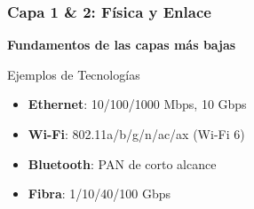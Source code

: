 \documentclass[aspectratio=169]{beamer}
\begin{document}
      \begin{frame}
        \frametitle{Capa 1 \& 2: Física y Enlace}
        
        \begin{center}
        \Large \textbf{Fundamentos de las capas más bajas}
        \end{center}
        
        
        \begin{block}{Ejemplos de Tecnologías}
        \begin{itemize}
        \item \textbf{Ethernet}: 10/100/1000 Mbps, 10 Gbps
        \item \textbf{Wi-Fi}: 802.11a/b/g/n/ac/ax (Wi-Fi 6)
        \item \textbf{Bluetooth}: PAN de corto alcance
        \item \textbf{Fibra}: 1/10/40/100 Gbps
        \end{itemize}
        \end{block}
        \end{frame}
      
\end{document}
